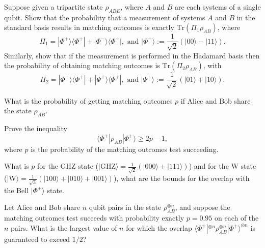 \documentclass[a4paper,10pt,landscape,twocolumn]{scrartcl}
\newcommand{\ket}[1]{| #1 \rangle}
\newcommand{\bra}[1]{\langle #1 |}
\newcommand{\proj}[1]{| #1 \rangle \langle #1 |}
\newcommand{\Tr}{\text{Tr}}
\begin{document}
\begin{exercise}
\begin{subex}[Exercise 6.2.2]
Suppose given a tripartite state $\rho_{ABE}$, where $A$ and $B$ are each systems of a
single qubit. Show that the probability that a measurement of systems $A$ and $B$ in the standard
basis results in matching outcomes is exactly $\Tr\left( \Pi_1 \rho_{AB}\right)$, where
\begin{equation}
\Pi_1=\proj{\Phi^+}+\proj{\Phi^-}, \text{ and } \ket{\Phi^-}:=\frac{1}{\sqrt{2}}(\ket{00}-\ket{11}).
\end{equation}
Similarly, show that if the measurement is performed in the Hadamard basis then the probability
of obtaining matching outcomes is $\Tr\left( \Pi_2 \rho_{AB}\right)$, with
\begin{equation}
\Pi_2=\proj{\Phi^+}+\proj{\Psi^+}, \text{ and } \ket{\Psi^+}:=\frac{1}{\sqrt{2}}(\ket{01}+\ket{10}).
\end{equation}
\end{subex}

\begin{subex}
What is the probability of getting matching outcomes $p$ if Alice and Bob share the state $\rho_{AB}$.
\end{subex}

\begin{subex}[Equation (6.6)]
Prove the inequality 
\begin{equation}
\bra{\Phi^+}\rho_{AB}\ket{\Phi^+}\geq 2p-1,
\end{equation}
where $p$ is the probability of the matching outcomes test succeeding.
\end{subex}

\begin{subex}[Examples]
What is $p$ for the GHZ state ($\ket{\text{GHZ}}=\frac{1}{\sqrt{2}}(\ket{000}+\ket{111})$) and for the W state ($\ket{\text{W}}=\frac{1}{\sqrt{3}}(\ket{100}+\ket{010}+\ket{001})$), what are the bounds for the overlap with the Bell $\ket{\Phi^+}$ state.
\end{subex}

\begin{subex}
Let Alice and Bob share $n$ qubit pairs in the state $\rho _{AB}^{\otimes n}$, and suppose the matching outcomes test succeeds with probability exactly $p=0.95$ on each of the $n$ pairs. What is the largest value of $n$ for which the overlap $\langle \Phi^+|^{\otimes n}\rho _{AB}^{\otimes n}|\Phi^+\rangle ^{\otimes n}$ is guaranteed to exceed $1/2$? 
\end{subex}
\end{exercise}
\end{document}
